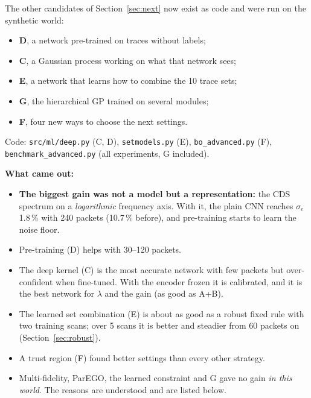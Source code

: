 \documentclass[10pt]{article}
\newcommand{\code}[1]{\texttt{#1}}
\begin{document}
\begin{basic}
The other candidates of Section~\ref{sec:next} now exist as code and were run on the synthetic world:
\begin{itemize}
\item \textbf{D}, a network pre-trained on traces without labels;
\item \textbf{C}, a Gaussian process working on what that network sees;
\item \textbf{E}, a network that learns how to combine the 10 trace sets;
\item \textbf{G}, the hierarchical GP trained on several modules;
\item \textbf{F}, four new ways to choose the next settings.
\end{itemize}
Code: \code{src/ml/deep.py} (C, D), \code{setmodels.py} (E), \code{bo\_advanced.py} (F), \code{benchmark\_advanced.py} (all
experiments, G included).

\textbf{What came out:}
\begin{itemize}
\item \textbf{The biggest gain was not a model but a representation:} the CDS spectrum on a \emph{logarithmic} frequency axis. With it,
  the plain CNN reaches $\sigma_e$ 1.8\,\% with 240 packets (10.7\,\% before), and pre-training starts to learn the noise floor.
\item Pre-training (D) helps with 30--120 packets.
\item The deep kernel (C) is the most accurate network with few packets but over-confident when fine-tuned. With the encoder frozen it
  is calibrated, and it is the best network for $\lambda$ and the gain (as good as A+B).
\item The learned set combination (E) is about as good as a robust fixed rule with two training scans; over 5 scans it is better and
  steadier from 60 packets on (Section~\ref{sec:robust}).
\item A trust region (F) found better settings than every other strategy.
\item Multi-fidelity, ParEGO, the learned constraint and G gave no gain \emph{in this world}. The reasons are understood and are listed
  below.
\end{itemize}
\end{basic}
\end{document}
